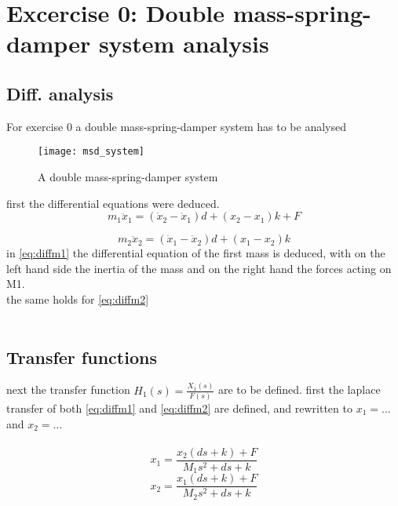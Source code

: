 \documentclass[report.tex]{subfiles}
\begin{document}
\chapter{Excercise 0: Double mass-spring-damper system analysis}
\section{Diff. analysis}

For exercise 0 a double mass-spring-damper system has to be analysed

\begin{figure}[H]
	\texttt{[image: msd\_system]}
	\centering
	\caption{A double mass-spring-damper system}
	\label{fig:intro_system}
\end{figure}
first the differential equations were deduced.\\

\begin{equation}
\label{eq:diffm1}
{ m }_{ 1 }{ \ddot { x }  }_{ 1 }=({ \dot { x }  }_{ 2 }-\dot { x } _{ 1 })d+({ x }_{ 2 }-{ x }_{ 1 })k+F
\end{equation}

\begin{equation}
\label{eq:diffm2}
{ m }_{ 2 }{ \ddot { x }  }_{ 2 }=({ \dot { x }  }_{ 1 }-\dot { x } _{ 2 })d+({ x }_{ 1 }-{ x }_{ 2 })k
\end{equation}
in \eqref{eq:diffm1} the differential equation of the first mass is deduced, with on the left hand side the inertia of the mass and on the right hand the forces acting on M1.\\
the same holds for \eqref{eq:diffm2}\\
\\
\section{Transfer functions}
next the transfer function ${ H }_{ 1 }(s)=\frac { { X }_{ 1 }(s) }{ F(s) } $ are to be defined. first the laplace transfer of both \eqref{eq:diffm1} and \eqref{eq:diffm2} are defined, and rewritten to $x_1=...$ and $x_2=...$\\
\\

\begin{equation}
\label{eq:lap_x1}
x_1=\frac{x_2(ds+k)+F}{M_1s^2+ds+k}
\end{equation}
\begin{equation}
\label{eq:lap_x2}
x_2=\frac{x_1(ds+k)+F}{M_2s^2+ds+k}
\end{equation}
\end{document}
